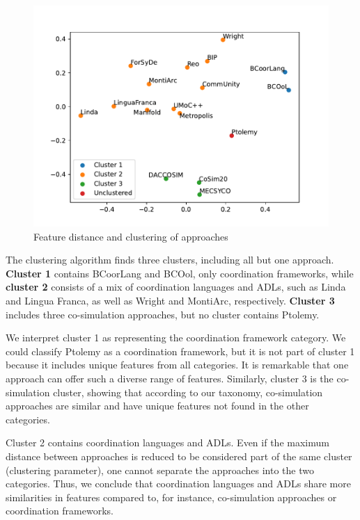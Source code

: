 \documentclass[runningheads]{llncs}
\begin{document}
\begin{figure}[ht]
	\centering
	\includegraphics[width=1\textwidth]{images/approach_scatter}
	\caption{Feature distance and clustering of approaches}
	\label{fig: clusters}
\end{figure}

The clustering algorithm finds three clusters, including all but one approach.
\textbf{Cluster 1} contains BCoorLang and BCOol, only coordination frameworks, while \textbf{cluster 2} consists of a mix of coordination languages and ADLs, such as Linda and Lingua Franca, as well as Wright and MontiArc, respectively.
\textbf{Cluster 3} includes three co-simulation approaches, but no cluster contains Ptolemy.

We interpret cluster 1 as representing the coordination framework category.
We could classify Ptolemy as a coordination framework, but it is not part of cluster 1 because it includes unique features from all categories.
It is remarkable that one approach can offer such a diverse range of features.
Similarly, cluster 3 is the co-simulation cluster, showing that according to our taxonomy, co-simulation approaches are similar and have unique features not found in the other categories.

Cluster 2 contains coordination languages and ADLs.
Even if the maximum distance between approaches is reduced to be considered part of the same cluster (clustering parameter), one cannot separate the approaches into the two categories.
Thus, we conclude that coordination languages and ADLs share more similarities in features compared to, for instance, co-simulation approaches or coordination frameworks.
\end{document}
